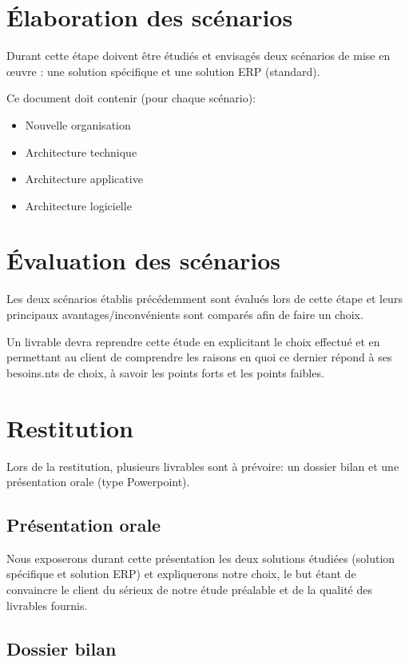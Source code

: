 	\section{Élaboration des scénarios}

		Durant cette étape doivent être étudiés et envisagés deux scénarios de mise en œuvre : une solution spécifique et une solution ERP (standard).

		Ce document doit contenir (pour chaque scénario):
		\begin{itemize}
		    \item Nouvelle organisation
		    \item Architecture technique
		    \item Architecture applicative
		    \item Architecture logicielle
		\end{itemize}


	\section{Évaluation des scénarios}

		Les deux scénarios établis précédemment sont évalués lors de cette étape et leurs principaux avantages/inconvénients sont comparés afin de faire un choix.

		Un livrable devra reprendre cette étude en explicitant le choix effectué et en permettant au client de comprendre les raisons en quoi ce dernier répond à ses besoins.nts de choix, à savoir les points forts et les points faibles.


	\section{Restitution}

		Lors de la restitution, plusieurs livrables sont à prévoire: un dossier bilan et une présentation orale (type Powerpoint).

		\subsection{Présentation orale}

		Nous exposerons durant cette présentation les deux solutions étudiées (solution spécifique et solution ERP) et expliquerons notre choix, le but étant de convaincre le client du sérieux de notre étude préalable et de la qualité des livrables fournis.

		\subsection{Dossier bilan}

